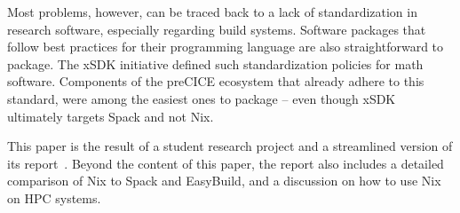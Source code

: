 \documentclass{eceasst}
\begin{document}
Most problems, however, can be traced back to a lack of standardization in research software, especially regarding build systems.
Software packages that follow best practices for their programming language are also straightforward to package.
The xSDK initiative defined such standardization policies for math software. Components of the preCICE ecosystem that already adhere to this standard, were among the easiest ones to package -- even though xSDK  ultimately targets Spack and not Nix.

This paper is the result of a student research project and a streamlined version of its report~\cite{studentreport}. Beyond the content of this paper, the report also includes a detailed comparison of Nix to Spack and EasyBuild, and a discussion on how to use Nix on HPC systems.





\end{document}
